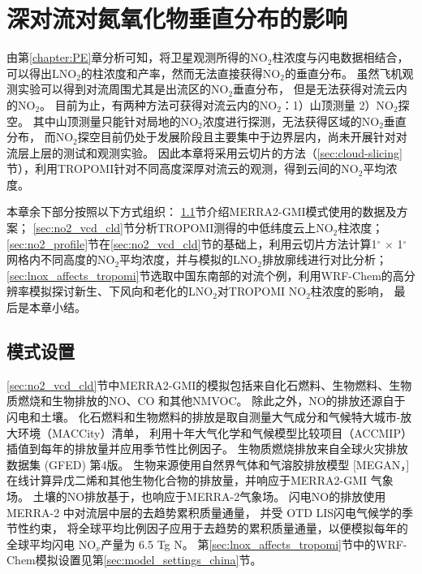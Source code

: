 
\chapter{深对流对氮氧化物垂直分布的影响} \label{sec:effects_on_nox_profile}

由第\ref{chapter:PE}章分析可知，将卫星观测所得的NO$_2$柱浓度与闪电数据相结合，
可以得出LNO$_2$的柱浓度和产率，然而无法直接获得NO$_2$的垂直分布。
虽然飞机观测实验可以得到对流周围尤其是出流区的NO$_2$垂直分布\citep{Barth.2019}，
但是无法获得对流云内的NO$_2$。
目前为止，有两种方法可获得对流云内的NO$_2$：1）山顶测量 2）NO$_2$探空。
其中山顶测量只能针对局地的NO$_2$浓度进行探测，无法获得区域的NO$_2$垂直分布\citep{Reiter.1970}，
而NO$_2$探空目前仍处于发展阶段且主要集中于边界层内\citep{Sluis.2010}，尚未开展针对对流层上层的测试和观测实验。
因此本章将采用云切片的方法（\ref{sec:cloud-slicing}节），利用TROPOMI针对不同高度深厚对流云的观测，得到云间的NO$_2$平均浓度。

本章余下部分按照以下方式组织：
\ref{sec:model_settings_gmi}节介绍MERRA2-GMI模式使用的数据及方案；
\ref{sec:no2_vcd_cld}节分析TROPOMI测得的中低纬度云上NO$_2$柱浓度；
\ref{sec:no2_profile}节在\ref{sec:no2_vcd_cld}节的基础上，利用云切片方法计算1$^{\circ}$ $\times$ 1$^{\circ}$ 网格内不同高度的NO$_2$平均浓度，并与模拟的LNO$_2$排放廓线进行对比分析；
\ref{sec:lnox_affects_tropomi}节选取中国东南部的对流个例，利用WRF-Chem的高分辨率模拟探讨新生、下风向和老化的LNO$_2$对TROPOMI NO$_2$柱浓度的影响，
最后是本章小结。



\section{模式设置} \label{sec:model_settings_gmi}

\ref{sec:no2_vcd_cld}节中MERRA2-GMI的模拟包括来自化石燃料、生物燃料、生物质燃烧和生物排放的NO、CO 和其他NMVOC。
除此之外，NO的排放还源自于闪电和土壤。
化石燃料和生物燃料的排放是取自测量大气成分和气候特大城市-放大环境（MACCity）清单\citep{Granier.2011}，
利用十年大气化学和气候模型比较项目（ACCMIP）插值到每年的排放量并应用季节性比例因子\citep{Lamarque.2010}。
生物质燃烧排放来自全球火灾排放数据集 (GFED) 第4版\citep{Giglio.2013}。
生物来源使用自然界气体和气溶胶排放模型 [MEGAN，\citet{Guenther.1999}]
在线计算异戊二烯和其他生物化合物的排放量，并响应于MERRA2-GMI 气象场。
土壤的NO排放基于\citet{Yienger.1995}，也响应于MERRA-2气象场。
闪电NO的排放使用 MERRA-2 中对流层中层的去趋势累积质量通量\citep{Allen.2010}，
并受 OTD LIS闪电气候学的季节性约束\citep{Cecil.2014}，
将全球平均比例因子应用于去趋势的累积质量通量，以便模拟每年的全球平均闪电 NO$_x$产量为 6.5 Tg N。
第\ref{sec:lnox_affects_tropomi}节中的WRF-Chem模拟设置见第\ref{sec:model_settings_china}节。

